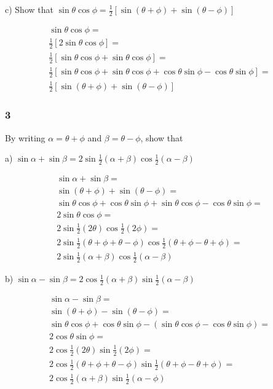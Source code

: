 \documentclass[]{report}
\begin{document}
c) Show that $\sin\theta\cos\phi = \frac{1}{2}[\sin(\theta + \phi) + \sin(\theta - \phi)]$

\begin{align*}
\sin\theta\cos\phi = \\
\frac{1}{2}[2\sin\theta\cos\phi] = \\
\frac{1}{2}[\sin\theta\cos\phi + \sin\theta\cos\phi] = \\
\frac{1}{2}[\sin\theta\cos\phi + \sin\theta\cos\phi + \cos\theta\sin\phi - \cos\theta\sin\phi] = \\
\frac{1}{2}[\sin(\theta + \phi) + \sin(\theta - \phi)]
\end{align*}

\subsubsection{3}

By writing $\alpha = \theta + \phi$ and $\beta = \theta - \phi$, show that

a) $\sin \alpha + \sin \beta = 2\sin\frac{1}{2}(\alpha + \beta)\cos\frac{1}{2}(\alpha - \beta)$

\begin{align*}
\sin \alpha + \sin \beta =  \\
\sin (\theta + \phi) + \sin(\theta - \phi) = \\
\sin\theta\cos\phi +  \cos\theta\sin\phi + \sin\theta\cos\phi - \cos\theta\sin\phi = \\
 2\sin\theta\cos\phi  = \\
 2\sin\frac{1}{2}(2\theta )\cos\frac{1}{2}(2\phi)  = \\
 2\sin\frac{1}{2}(\theta + \phi + \theta - \phi)\cos\frac{1}{2}(\theta + \phi - \theta + \phi)  = \\
 2\sin\frac{1}{2}(\alpha + \beta)\cos\frac{1}{2}(\alpha - \beta)
\end{align*}

b) $\sin\alpha - \sin\beta = 2 \cos\frac{1}{2}(\alpha + \beta)\sin\frac{1}{2}(\alpha - \beta)$

\begin{align*}
\sin\alpha  - \sin\beta = \\
\sin(\theta + \phi) - \sin(\theta-\phi) = \\
\sin\theta\cos\phi + \cos\theta\sin\phi - (\sin\theta\cos\phi - \cos\theta\sin\phi) = \\
2\cos\theta\sin\phi = \\
2\cos\frac{1}{2}(2\theta)\sin\frac{1}{2}(2\phi) = \\
2\cos\frac{1}{2}(\theta + \phi + \theta - \phi)\sin\frac{1}{2}(\theta + \phi - \theta + \phi) = \\
2\cos\frac{1}{2}(\alpha+ \beta)\sin\frac{1}{2}(\alpha -  \phi)
\end{align*}
\end{document}
